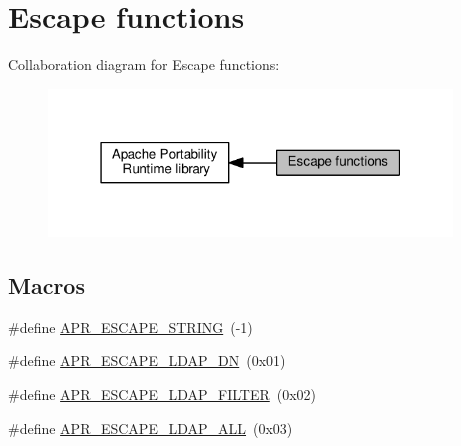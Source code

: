 \hypertarget{group__APR__Util__Escaping}{}\section{Escape functions}
\label{group__APR__Util__Escaping}
Collaboration diagram for Escape functions\+:
\nopagebreak
\begin{figure}[H]
\begin{center}
\leavevmode
\includegraphics[width=304pt]{group__APR__Util__Escaping}
\end{center}
\end{figure}
\subsection*{Macros}
\begin{DoxyCompactItemize}
\item 
\#define \hyperlink{group__APR__Util__Escaping_ga793ae1b187ce490c65eeee2eb59d2831}{A\+P\+R\+\_\+\+E\+S\+C\+A\+P\+E\+\_\+\+S\+T\+R\+I\+NG}~(-\/1)
\item 
\#define \hyperlink{group__APR__Util__Escaping_gaf9f0f1e78bc6fef3358ceced2e738b39}{A\+P\+R\+\_\+\+E\+S\+C\+A\+P\+E\+\_\+\+L\+D\+A\+P\+\_\+\+DN}~(0x01)
\item 
\#define \hyperlink{group__APR__Util__Escaping_gae42ad796afe5808eb98fc32c2345da0d}{A\+P\+R\+\_\+\+E\+S\+C\+A\+P\+E\+\_\+\+L\+D\+A\+P\+\_\+\+F\+I\+L\+T\+ER}~(0x02)
\item 
\#define \hyperlink{group__APR__Util__Escaping_ga047bef19e40c76df29afd5ec076af0fc}{A\+P\+R\+\_\+\+E\+S\+C\+A\+P\+E\+\_\+\+L\+D\+A\+P\+\_\+\+A\+LL}~(0x03)
\end{DoxyCompactItemize}
